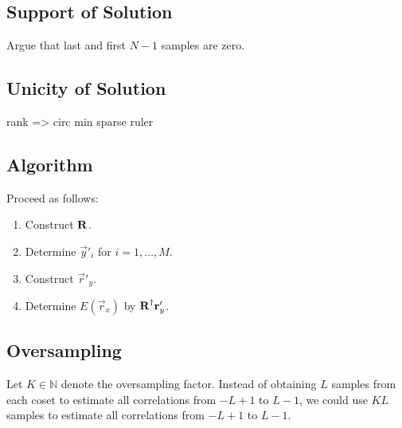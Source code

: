 \documentclass[a4paper, openany, oneside]{memoir}
\begin{document}
\subsection{Support of Solution}
Argue that last and first $N-1$ samples are zero.

\subsection{Unicity of Solution}
rank => circ min sparse ruler

\subsection{Algorithm}
Proceed as follows:
\begin{enumerate}
    \item Construct $\boldsymbol{\mathbf{R}}$.
    \item Determine $\vec{y}'_i$ for $i = 1,\ldots,M$.
    \item Construct $\vec{r}'_y$.
    \item Determine $E(\vec{r}_x)$ by $\boldsymbol{\mathbf{R}}^\dagger\boldsymbol{\mathbf{r}}'_y$.
\end{enumerate}

\subsection{Oversampling}
Let $K \in \mathbb{N}$ denote the oversampling factor. Instead of obtaining $L$ samples from each coset to estimate all correlations from $-L+1$ to $L-1$, we could use $KL$ samples to estimate all correlations from $-L+1$ to $L-1$.
\end{document}
